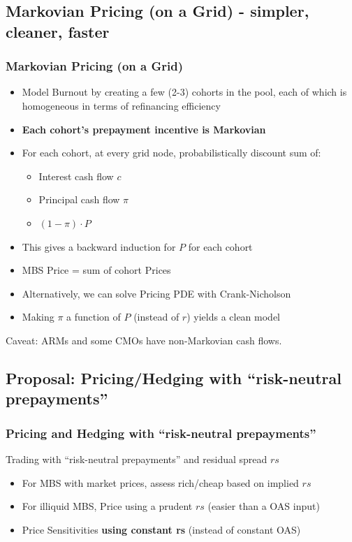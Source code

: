 \documentclass{beamer}
\begin{document}
\subsection{Markovian Pricing (on a Grid) - simpler, cleaner, faster}

\begin{frame}
\frametitle{Markovian Pricing (on a Grid)}
\begin{itemize}
\item Model Burnout by creating a few (2-3) cohorts in the pool, each of which is homogeneous in terms of refinancing efficiency
\item {\bf Each cohort's prepayment incentive is Markovian}
\item For each cohort, at every grid node, probabilistically discount sum of:
\begin{itemize}
\item Interest cash flow $c$
\item Principal cash flow $\pi$
\item $(1 - \pi) \cdot P$
\end{itemize}
\item This gives a backward induction for $P$ for each cohort
\item MBS Price = sum of cohort Prices
\item Alternatively, we can solve Pricing PDE with Crank-Nicholson
\item Making $\pi$ a function of $P$ (instead of $r$) yields a clean model
\end{itemize}
Caveat: ARMs and some CMOs have non-Markovian cash flows.
\end{frame}

\subsection{{\bf Proposal: Pricing/Hedging with  ``risk-neutral prepayments''}}

\begin{frame}
\frametitle{Pricing and Hedging with ``risk-neutral prepayments''}
Trading with ``risk-neutral prepayments'' and residual spread $rs$
\begin{itemize}
\item For MBS with market prices, assess rich/cheap based on implied $rs$
\item For illiquid MBS, Price using a prudent $rs$ (easier than a OAS input)
\item Price Sensitivities {\bf using constant rs} (instead of constant OAS)
\end{itemize}
\end{frame}
\end{document}
